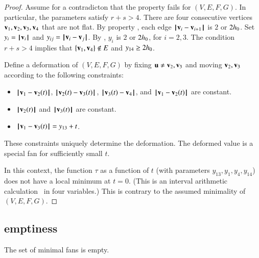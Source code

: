 \begin{proof} 
Assume for a contradicton that the property fails for $(V,E,F,G)$.
In particular, the parameters satisfy $r+s>4$.
There are four consecutive vertices $\v_1,\v_2,\v_3,\v_4$ that are not flat.   By property ,   each edge $\norm{\v_i}{\v_{i+1}}$ is $2$ or $2\hm$. Set $y_i = \normo{\v_i}$ and $y_{ij} = \norm{\v_i}{\v_j}$.   By , $y_i$ is $2$ or $2\hm$, for $i=2,3$.   The condition $r+s>4$ implies that $\{\v_1,\v_4\}\not\in E$ and $y_{14}\ge 2\hm$.

Define a deformation of $(V,E,F,G)$ by fixing $\u\ne \v_2,\v_3$ and moving $\v_2,\v_3$ according to the following constraints:
\begin{itemize}
\item $\norm{\v_1}{\v_2(t)}$, $\norm{\v_2(t)}{\v_3(t)}$, $\norm{\v_3(t)}{\v_4}$, and $\norm{\v_1}{\v_2(t)}$ are constant.
\item $\normo{\v_2(t)}$ and $\normo{\v_3(t)}$ are constant.
\item $\norm{\v_1}{\v_3(t)} = y_{13} + t$.
\end{itemize}
These constraints uniquely determine the deformation. The deformed value is a special fan for sufficiently small $t$.

In this context, the function $\tau$ as a function of $t$ (with parameters $y_{13},y_1,y_4,y_{14}$) does not have a local minimum at $t=0$.
(This is an interval arithmetic calculation~\cite[cc:qua]{hales:2009:nonlinear} in four variables.) %
This is contrary to the assumed minimality of $(V,E,F,G)$.
\end{proof}


\subsection{emptiness}

\begin{lemma}\label{lemma:min-empty}  
The set of minimal fans is empty.
\end{lemma}

